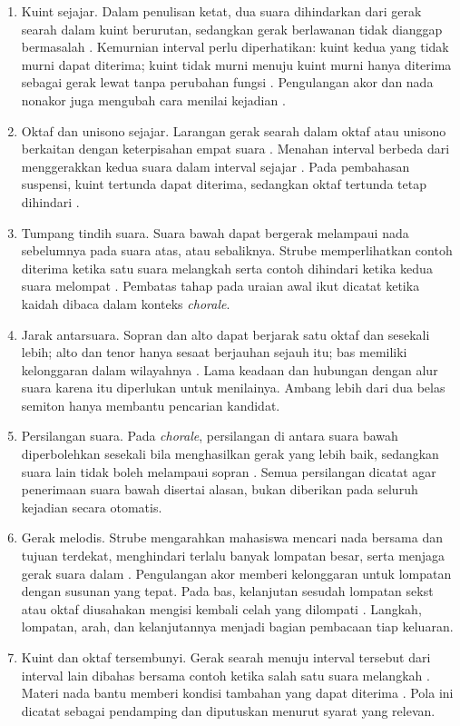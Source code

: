 \begin{enumerate}
    \item Kuint sejajar. Dalam penulisan ketat, dua suara dihindarkan dari gerak searah dalam kuint berurutan, sedangkan gerak berlawanan tidak dianggap bermasalah \parencite[9, 12]{strube1928}. Kemurnian interval perlu diperhatikan: kuint kedua yang tidak murni dapat diterima; kuint tidak murni menuju kuint murni hanya diterima sebagai gerak lewat tanpa perubahan fungsi \parencite[34--35]{strube1928}. Pengulangan akor dan nada nonakor juga mengubah cara menilai kejadian \parencite[35]{strube1928}.
    \item Oktaf dan unisono sejajar. Larangan gerak searah dalam oktaf atau unisono berkaitan dengan keterpisahan empat suara \parencite[9]{strube1928}. Menahan interval berbeda dari menggerakkan kedua suara dalam interval sejajar \parencite[23]{strube1928}. Pada pembahasan suspensi, kuint tertunda dapat diterima, sedangkan oktaf tertunda tetap dihindari \parencite[83]{strube1928}.
    \item Tumpang tindih suara. Suara bawah dapat bergerak melampaui nada sebelumnya pada suara atas, atau sebaliknya. Strube memperlihatkan contoh diterima ketika satu suara melangkah serta contoh dihindari ketika kedua suara melompat \parencite[12--13]{strube1928}. Pembatas tahap pada uraian awal ikut dicatat ketika kaidah dibaca dalam konteks \textit{chorale}.
    \item Jarak antarsuara. Sopran dan alto dapat berjarak satu oktaf dan sesekali lebih; alto dan tenor hanya sesaat berjauhan sejauh itu; bas memiliki kelonggaran dalam wilayahnya \parencite[20]{strube1928}. Lama keadaan dan hubungan dengan alur suara karena itu diperlukan untuk menilainya. Ambang lebih dari dua belas semiton hanya membantu pencarian kandidat.
    \item Persilangan suara. Pada \textit{chorale}, persilangan di antara suara bawah diperbolehkan sesekali bila menghasilkan gerak yang lebih baik, sedangkan suara lain tidak boleh melampaui sopran \parencite[174]{strube1928}. Semua persilangan dicatat agar penerimaan suara bawah disertai alasan, bukan diberikan pada seluruh kejadian secara otomatis.
    \item Gerak melodis. Strube mengarahkan mahasiswa mencari nada bersama dan tujuan terdekat, menghindari terlalu banyak lompatan besar, serta menjaga gerak suara dalam \parencite[7, 13, 20]{strube1928}. Pengulangan akor memberi kelonggaran untuk lompatan dengan susunan yang tepat. Pada bas, kelanjutan sesudah lompatan sekst atau oktaf diusahakan mengisi kembali celah yang dilompati \parencite[23]{strube1928}. Langkah, lompatan, arah, dan kelanjutannya menjadi bagian pembacaan tiap keluaran.
    \item Kuint dan oktaf tersembunyi. Gerak searah menuju interval tersebut dari interval lain dibahas bersama contoh ketika salah satu suara melangkah \parencite[12]{strube1928}. Materi nada bantu memberi kondisi tambahan yang dapat diterima \parencite[109]{strube1928}. Pola ini dicatat sebagai pendamping dan diputuskan menurut syarat yang relevan.
\end{enumerate}

